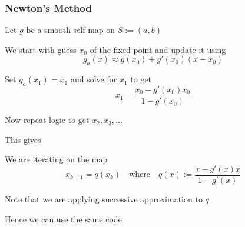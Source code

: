 \begin{frame}
    \frametitle{Newton's Method}

    \vspace{0.3em}
    Let $g$ be a smooth self-map on $S := (a, b)$ 

    \vspace{0.3em}
    We start with guess $x_0$ of the fixed point and update it
    using
    $$g_a(x) \approx g(x_0) + g'(x_0)(x - x_0)$$

    \vspace{0.3em}
    Set $g_a(x_1) = x_1$ and solve for $x_1$ to get
    \begin{equation*}
        x_1 = \frac{x_0 - g'(x_0) x_0}{1 - g'(x_0)}
    \end{equation*}

    Now repeat logic to get $x_2, x_3, \ldots $

\end{frame}

\begin{frame}

    This gives 

    \vspace{0.3em}
    \vspace{0.3em}
    We are iterating on the map
    \begin{equation*}
        x_{k+1} = q(x_k) 
        \quad \text{where} \quad
        q(x) := \frac{x - g'(x) x}{1 - g'(x)}
    \end{equation*}

    \vspace{0.3em}
    Note that we are applying successive approximation to $q$

    \vspace{0.3em}
    \vspace{0.3em}
    \vspace{0.3em}
    Hence we can use the same code

\end{frame}


